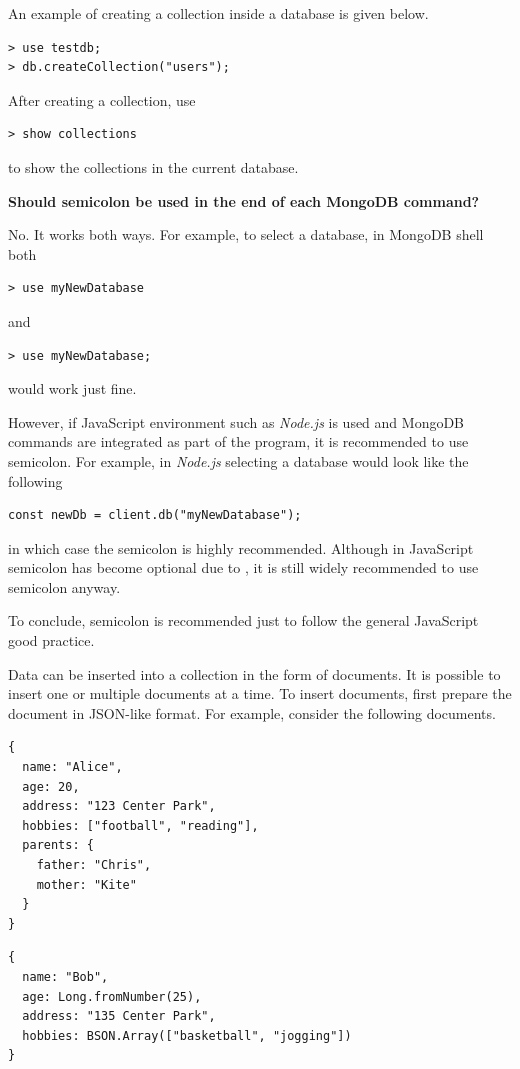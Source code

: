 An example of creating a collection inside a database is given below.
\begin{lstlisting}
> use testdb;
> db.createCollection("users");
\end{lstlisting}

After creating a collection, use
\begin{lstlisting}
> show collections
\end{lstlisting}
to show the collections in the current database.

\begin{mdframed}
\noindent \textbf{Should semicolon be used in the end of each MongoDB command?}

No. It works both ways. For example, to select a database, in MongoDB shell both
\begin{lstlisting}
> use myNewDatabase
\end{lstlisting}
and
\begin{lstlisting}
> use myNewDatabase;
\end{lstlisting}
would work just fine. 

However, if JavaScript environment such as \textit{Node.js} is used and MongoDB commands are integrated as part of the program, it is recommended to use semicolon. For example, in \textit{Node.js} selecting a database would look like the following
\begin{lstlisting}
const newDb = client.db("myNewDatabase");
\end{lstlisting}
in which case the semicolon is highly recommended. Although in JavaScript semicolon has become optional due to , it is still widely recommended to use semicolon anyway.

To conclude, semicolon is recommended just to follow the general JavaScript good practice. 
\end{mdframed}

Data can be inserted into a collection in the form of documents. It is possible to insert one or multiple documents at a time. To insert documents, first prepare the document in JSON-like format. For example, consider the following documents.
\begin{lstlisting}
{
  name: "Alice",
  age: 20,
  address: "123 Center Park",
  hobbies: ["football", "reading"],
  parents: {
    father: "Chris",
    mother: "Kite"
  }
}
\end{lstlisting}
\begin{lstlisting}
{
  name: "Bob",
  age: Long.fromNumber(25),
  address: "135 Center Park",
  hobbies: BSON.Array(["basketball", "jogging"])
}
\end{lstlisting}


